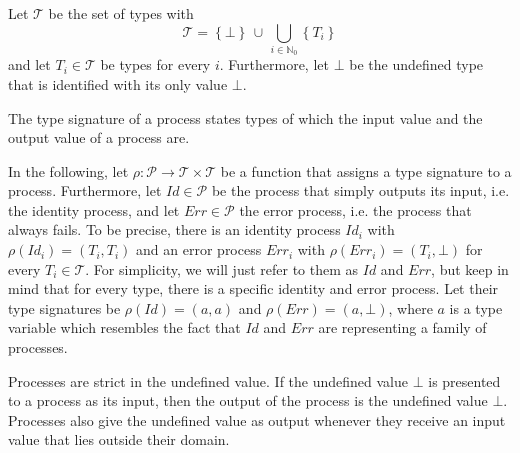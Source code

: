 \begin{definition}[Types]
Let $\mathcal{T}$ be the set of types with
\begin{equation}
  \mathcal{T} = \left\{ \bot \right\} \, \cup \, \bigcup_{i \in \mathbb{N}_0} \left\{ T_i \right\}
\end{equation}
and let $T_i \in \mathcal{T}$ be types for every $i$. Furthermore, let $\bot$ be the undefined type that is identified with its only value $\bot$.

\hfill\qedsymbol
\end{definition}

\begin{definition}
\label{def:type_signature}
The type signature of a process states types of which the input value and the output value of a process are.

\hfill\qedsymbol
\end{definition}

In the following, let $\rho \colon \mathcal{P} \to \mathcal{T} \times \mathcal{T}$ be a function that assigns a type signature to a process. Furthermore, let $Id \in \mathcal{P}$ be the process that simply outputs its input, i.e. the identity process, and let $Err \in \mathcal{P}$ the error process, i.e. the process that always fails. To be precise, there is an identity process $Id_i$ with $\rho \left( Id_i \right) = \left( T_i, T_i \right)$ and an error process $Err_i$ with $\rho \left( Err_i \right) = \left( T_i, \bot \right)$ for every $T_i \in \mathcal{T}$. For simplicity, we will just refer to them as $Id$ and $Err$, but keep in mind that for every type, there is a specific identity and error process. Let their type signatures be $\rho \left( Id \right) = \left( a, a \right)$ and $\rho \left( Err \right) = \left( a, \bot \right)$, where $a$ is a type variable which resembles the fact that $Id$ and $Err$ are representing a family of processes.

\begin{definition}
\label{def:process_strictness}
Processes are strict in the undefined value. If the undefined value $\bot$ is presented to a process as its input, then the output of the process is the undefined value $\bot$. Processes also give the undefined value as output whenever they receive an input value that lies outside their domain.

\hfill\qedsymbol
\end{definition}


